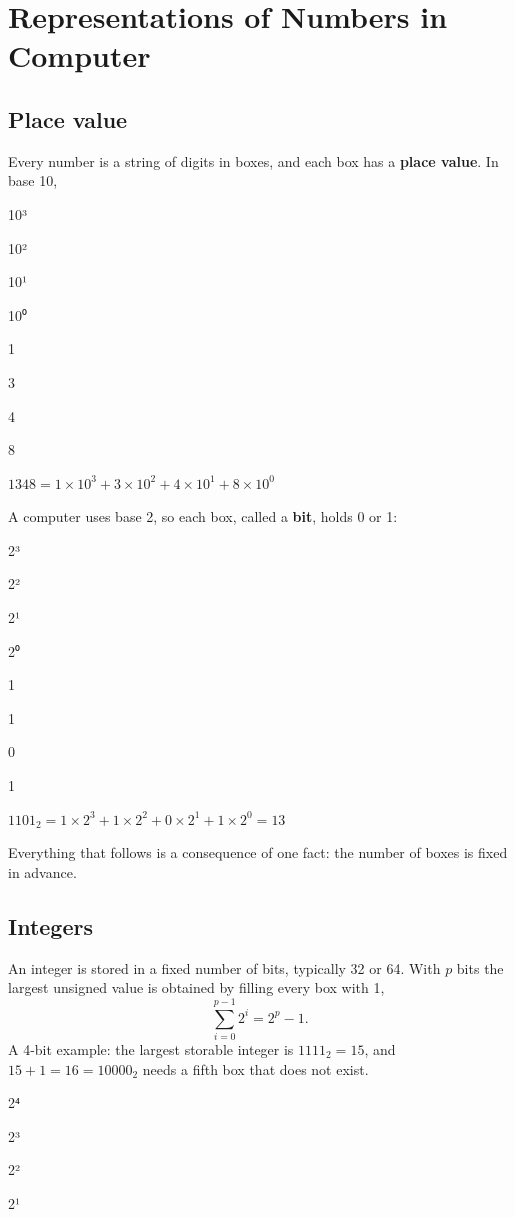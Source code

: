 \documentclass[
  letterpaper,
  DIV=11,
  numbers=noendperiod]{scrreprt}
\begin{document}
\section{Representations of Numbers in
Computer}\label{representations-of-numbers-in-computer}

\subsection{Place value}\label{place-value}

Every number is a string of digits in boxes, and each box has a
\textbf{place value}. In base 10,

10³

10²

10¹

10⁰

1

3

4

8

\(1348 = 1\times10^3 + 3\times10^2 + 4\times10^1 + 8\times10^0\)

A computer uses base 2, so each box, called a \textbf{bit}, holds 0 or
1:

2³

2²

2¹

2⁰

1

1

0

1

\(1101_2 = 1\times2^3 + 1\times2^2 + 0\times2^1 + 1\times2^0 = 13\)

Everything that follows is a consequence of one fact: the number of
boxes is fixed in advance.

\subsection{Integers}\label{integers}

An integer is stored in a fixed number of bits, typically 32 or 64. With
\(p\) bits the largest unsigned value is obtained by filling every box
with 1, \[
\sum_{i=0}^{p-1} 2^i = 2^p - 1 .
\] A 4-bit example: the largest storable integer is \(1111_2 = 15\), and
\(15 + 1 = 16 = 10000_2\) needs a fifth box that does not exist.

2⁴

2³

2²

2¹
\end{document}
